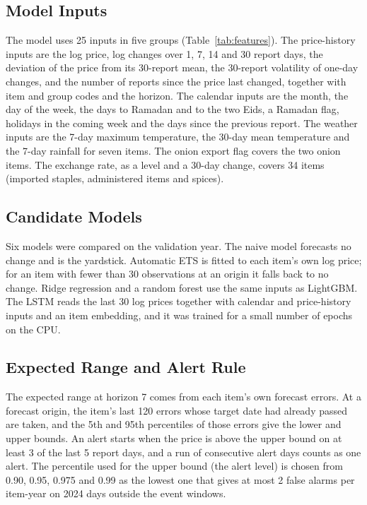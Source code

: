 \subsection{Model Inputs}
The model uses 25 inputs in five groups (Table~\ref{tab:features}). The price-history inputs are the log price, log changes over 1, 7, 14 and 30 report days, the deviation of the price from its 30-report mean, the 30-report volatility of one-day changes, and the number of reports since the price last changed, together with item and group codes and the horizon. The calendar inputs are the month, the day of the week, the days to Ramadan and to the two Eids, a Ramadan flag, holidays in the coming week and the days since the previous report. The weather inputs are the 7-day maximum temperature, the 30-day mean temperature and the 7-day rainfall for seven items. The onion export flag covers the two onion items. The exchange rate, as a level and a 30-day change, covers 34 items (imported staples, administered items and spices).

\begin{table}[H]\centering\small
\caption[Model inputs by driver group]{Model inputs by driver group.}\label{tab:features}

\par{}
\end{table}

\subsection{Candidate Models}
Six models were compared on the validation year. The naive model forecasts no change and is the yardstick. Automatic ETS is fitted to each item's own log price; for an item with fewer than 30 observations at an origin it falls back to no change. Ridge regression and a random forest use the same inputs as LightGBM. The LSTM reads the last 30 log prices together with calendar and price-history inputs and an item embedding, and it was trained for a small number of epochs on the CPU.

\subsection{Expected Range and Alert Rule}
The expected range at horizon 7 comes from each item's own forecast errors. At a forecast origin, the item's last 120 errors whose target date had already passed are taken, and the 5th and 95th percentiles of those errors give the lower and upper bounds. An alert starts when the price is above the upper bound on at least 3 of the last 5 report days, and a run of consecutive alert days counts as one alert. The percentile used for the upper bound (the alert level) is chosen from 0.90, 0.95, 0.975 and 0.99 as the lowest one that gives at most 2 false alarms per item-year on 2024 days outside the event windows.

